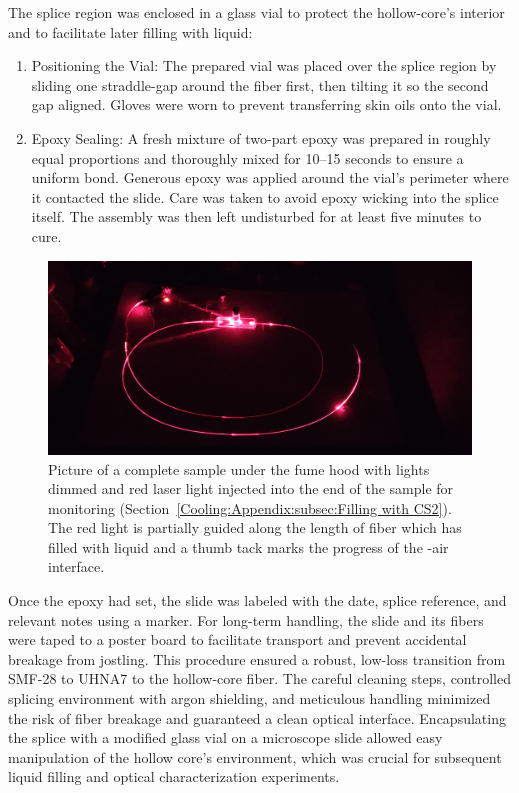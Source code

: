The splice region was enclosed in a glass vial to protect the hollow-core’s interior and to facilitate later filling with liquid:

\begin{enumerate}
	\item Positioning the Vial: The prepared vial was placed over the splice region by sliding one straddle-gap around the fiber first, then tilting it so the second gap aligned. Gloves were worn to prevent transferring skin oils onto the vial.
	\item Epoxy Sealing: A fresh mixture of two-part epoxy was prepared in roughly equal proportions and thoroughly mixed for 10–15 seconds to ensure a uniform bond. Generous epoxy was applied around the vial’s perimeter where it contacted the slide. Care was taken to avoid epoxy wicking into the splice itself. The assembly was then left undisturbed for at least five minutes to cure.
\end{enumerate}

\begin{figure}[t]
  \centering
  \includegraphics[width=\textwidth]{figs/3-Cooling/redLightWithThumbTackWholeSample.jpg}
  \caption{Picture of a complete sample under the fume hood with lights dimmed and red laser light injected into the end of the sample for monitoring (Section~\ref{Cooling:Appendix:subsec:Filling with CS2}). The red light is partially guided along the length of fiber which has filled with liquid  and a thumb tack marks the progress of the -air interface.}
  \label{fig:red Light with Thumb Tack Whole Sample}
\end{figure}

Once the epoxy had set, the slide was labeled with the date, splice reference, and relevant notes using a marker. For long-term handling, the slide and its fibers were taped to a poster board to facilitate transport and prevent accidental breakage from jostling. This procedure ensured a robust, low-loss transition from \ac{SMF-28} to \ac{UHNA7} to the hollow-core fiber. The careful cleaning steps, controlled splicing environment with argon shielding, and meticulous handling minimized the risk of fiber breakage and guaranteed a clean optical interface. Encapsulating the splice with a modified glass vial on a microscope slide allowed easy manipulation of the hollow core’s environment, which was crucial for subsequent liquid filling and optical characterization experiments.

